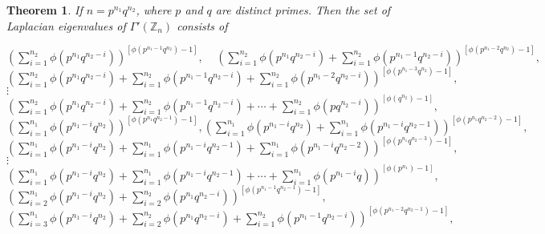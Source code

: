\documentclass{amsart}
\theoremstyle{plain}
\newtheorem{theorem}{Theorem}[section]
\theoremstyle{definition}
\theoremstyle{remark}
\begin{document}
\begin{theorem}
If $n = p^{n_1}q^{n_2}$, where $p$ and $q$ are distinct primes. Then the set of Laplacian eigenvalues of $\Gamma'(\mathbb{Z}_n)$ consists of 
\begin{center}
 $\left(\sum \limits_{i=1}^{n_2}\phi(p^{n_1}q^{n_2-i})\right)^{[\phi(p^{n_1-1}q^{n_2})-1]}, ~~~~~\left(\sum \limits_{i=1}^{n_2}\phi(p^{n_1}q^{n_2-i}) + \sum \limits_{i=1}^{n_2}\phi(p^{n_1-1}q^{n_2-i})\right)^{[\phi(p^{n_1-2}q^{n_2})-1]},$ \\
 
 $\left(\sum \limits_{i=1}^{n_2} \phi(p^{n_1}q^{n_2-i})+ \sum \limits_{i=1}^{n_2}\phi(p^{n_1-1}q^{n_2-i}) + \sum \limits_{i=1}^{n_2}\phi(p^{n_1-2}q^{n_2-i})\right)^{[\phi(p^{n_1-3}q^{n_2}) -1]},$ \\
 
 $\vdots$\\
 
 $\left(\sum \limits_{i=1}^{n_2} \phi(p^{n_1}q^{n_2-i})+ \sum \limits_{i=1}^{n_2}\phi(p^{n_1-1}q^{n_2-i}) + \cdots + \sum \limits_{i=1}^{n_2}\phi(pq^{n_2-i})\right)^{[\phi(q^{n_2}) -1]}, $\\
 
 $\left(\sum \limits_{i=1}^{n_1}\phi(p^{n_1-i}q^{n_2})\right)^{[\phi(p^{n_1}q^{n_2-1})-1]}, \left(\sum \limits_{i=1}^{n_1}\phi(p^{n_1-i}q^{n_2}) + \sum \limits_{i=1}^{n_1}\phi(p^{n_1-i}q^{n_2-1})\right)^{[\phi(p^{n_1}q^{n_2-2})-1]},$\\ 
 
 $\left(\sum \limits_{i=1}^{n_1} \phi(p^{n_1-i}q^{n_2})+ \sum \limits_{i=1}^{n_1}\phi(p^{n_1-i}q^{n_2-1}) + \sum \limits_{i=1}^{n_1}\phi(p^{n_1-i}q^{n_2-2})\right)^{[\phi(p^{n_1}q^{n_2-3}) -1]}, $\\
 
 $\vdots$\\
 
 $\left(\sum \limits_{i=1}^{n_1} \phi(p^{n_1-i}q^{n_2})+ \sum \limits_{i=1}^{n_1}\phi(p^{n_1-i}q^{n_2-1}) + \cdots + \sum \limits_{i=1}^{n_1}\phi(p^{n_1-i}q)\right)^{[\phi(p^{n_1}) -1]},$\\
 
 $\left(\sum \limits_{i=2}^{n_1}\phi(p^{n_1-i}q^{n_2})+ \sum \limits_{i=2}^{n_2}\phi(p^{n_1}q^{n_2-i})\right)^{[\phi(p^{n_1-1}q^{n_2-1})-1]},$\\
 
 $\left(\sum \limits_{i=3}^{n_1}\phi(p^{n_1-i}q^{n_2})+ \sum \limits_{i=2}^{n_2}\phi(p^{n_1}q^{n_2-i}) + \sum \limits_{i=1}^{n_2}\phi(p^{n_1-1}q^{n_2-i})\right)^{[\phi(p^{n_1-2}q^{n_2-1})-1]},$\\
 

\end{center}
\end{theorem}
\end{document}

